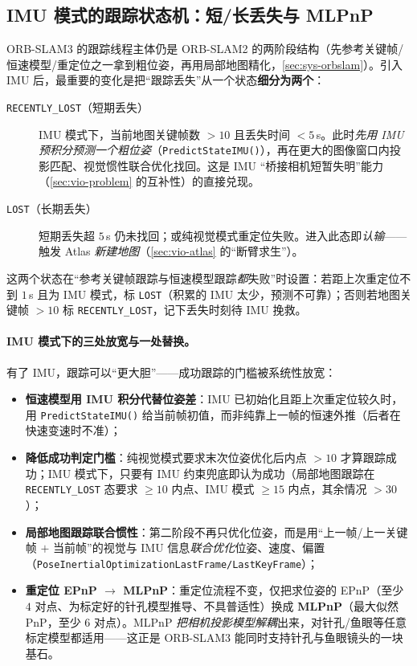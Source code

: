 \subsection{IMU 模式的跟踪状态机：短/长丢失与 MLPnP}
\label{sec:vio-orbslam3-track}

ORB-SLAM3 的跟踪线程主体仍是 ORB-SLAM2 的两阶段结构（先参考关键帧/恒速模型/重定位之一拿到粗位姿，再用局部地图精化，\cref{sec:sys-orbslam}）。引入 IMU 后，最重要的变化是把“跟踪丢失”从一个状态\textbf{细分为两个}\cite{campos2021orbslam3}：

\begin{description}
  \item[\texttt{RECENTLY\_LOST}（短期丢失）] IMU 模式下，当前地图关键帧数 $>10$ 且丢失时间 $<5\,$s。此时\emph{先用 IMU 预积分预测一个粗位姿}（\texttt{PredictStateIMU()}），再在更大的图像窗口内投影匹配、视觉惯性联合优化找回。这是 IMU “桥接相机短暂失明”能力（\cref{sec:vio-problem} 的互补性）的直接兑现。
  \item[\texttt{LOST}（长期丢失）] 短期丢失超 $5\,$s 仍未找回；或纯视觉模式重定位失败。进入此态即\emph{认输}——触发 Atlas \emph{新建地图}（\cref{sec:vio-atlas} 的“断臂求生”）。
\end{description}

这两个状态在“参考关键帧跟踪与恒速模型跟踪\emph{都}失败”时设置：若距上次重定位不到 $1\,$s 且为 IMU 模式，标 \texttt{LOST}（积累的 IMU 太少，预测不可靠）；否则若地图关键帧 $>10$ 标 \texttt{RECENTLY\_LOST}，记下丢失时刻待 IMU 挽救。

\paragraph{IMU 模式下的三处放宽与一处替换。}
有了 IMU，跟踪可以“更大胆”——成功跟踪的门槛被系统性放宽\cite{campos2021orbslam3}：
\begin{itemize}
  \item \textbf{恒速模型用 IMU 积分代替位姿差}：IMU 已初始化且距上次重定位较久时，用 \texttt{PredictStateIMU()} 给当前帧初值，而非纯靠上一帧的恒速外推（后者在快速变速时不准）；
  \item \textbf{降低成功判定门槛}：纯视觉模式要求末次位姿优化后内点 $>10$ 才算跟踪成功；IMU 模式下，只要有 IMU 约束兜底即认为成功（局部地图跟踪在 \texttt{RECENTLY\_LOST} 态要求 $\ge 10$ 内点、IMU 模式 $\ge 15$ 内点，其余情况 $>30$）；
  \item \textbf{局部地图跟踪联合惯性}：第二阶段不再只优化位姿，而是用“上一帧/上一关键帧 $+$ 当前帧”的视觉与 IMU 信息\emph{联合优化}位姿、速度、偏置（\texttt{PoseInertialOptimizationLastFrame/\allowbreak LastKeyFrame}）；
  \item \textbf{重定位 EPnP $\to$ MLPnP}：重定位流程不变，仅把求位姿的 EPnP（至少 $4$ 对点、为标定好的针孔模型推导、不具普适性）换成 \textbf{MLPnP}（最大似然 PnP，至少 $6$ 对点）。MLPnP \emph{把相机投影模型解耦}出来，对针孔/鱼眼等任意标定模型都适用——这正是 ORB-SLAM3 能同时支持针孔与鱼眼镜头的一块基石。
\end{itemize}

